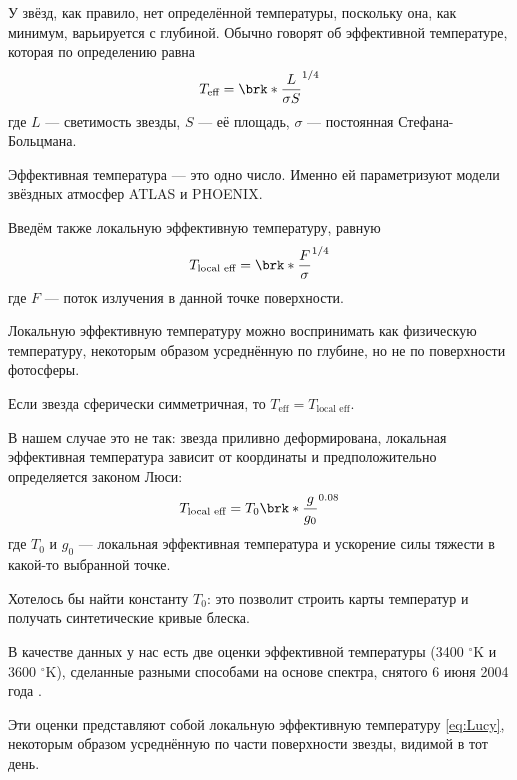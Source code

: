 

\label{sect:temperature}

У звёзд, как правило, нет определённой температуры, поскольку она, как минимум, варьируется с глубиной. Обычно говорят об эффективной температуре, которая по определению равна
\begin{equation}
T_\text{eff} = \brk*{\frac{L}{\sigma S}}^{1/4}
\label{eq:Teff}
\end{equation}
где $L$ --- светимость звезды, $S$ --- её площадь, $\sigma$ --- постоянная Стефана-Больцмана.

Эффективная температура --- это одно число. Именно ей параметризуют модели звёздных атмосфер ATLAS и PHOENIX.

Введём также локальную эффективную температуру, равную
\begin{equation}
T_\text{local eff} = \brk*{\frac{F}{\sigma}}^{1/4}
\label{eq:Tlocaleff}
\end{equation}
где $F$ --- поток излучения в данной точке поверхности.

Локальную эффективную температуру можно воспринимать как физическую температуру, некоторым образом усреднённую по глубине, но не по поверхности фотосферы.

Если звезда сферически симметричная, то $T_\text{eff} = T_\text{local eff}$.

В нашем случае это не так: звезда приливно деформирована, локальная эффективная температура зависит от координаты и предположительно определяется законом Люси:
\begin{equation}
T_\text{local eff} = T_0 \brk*{\frac{g}{g_0}}^{0.08}
\label{eq:Lucy}
\end{equation}
где $T_0$ и $g_0$ --- локальная эффективная температура и ускорение силы тяжести в какой-то выбранной точке.

Хотелось бы найти константу $T_0$: это позволит строить карты температур и получать синтетические кривые блеска.

В качестве данных у нас есть две оценки эффективной температуры (3400 ${}^\circ$K и 3600 ${}^\circ$K), сделанные разными способами на основе спектра, снятого 6 июня 2004 года \cite{TCRBtemperature}.

Эти оценки представляют собой локальную эффективную температуру \eqref{eq:Lucy}, некоторым образом усреднённую по части поверхности звезды, видимой в тот день.

